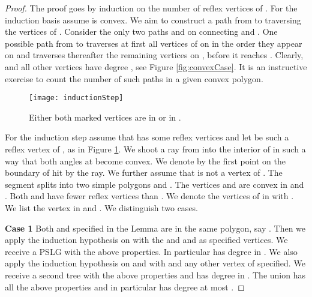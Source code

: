 \documentclass[12pt]{article}
\begin{document}
\begin{proof}
	The proof goes by induction on the number of reflex vertices of .
	For the induction basis assume  is convex. 
	We aim to construct a path from  to  traversing
	the vertices of . Consider the only two paths  and  on  connecting 
	 and . One possible path from 
	 to  traverses at first all vertices of  on  in the order 
	they appear on  and traverses thereafter the remaining vertices on ,
	before it reaches .
	Clearly,  and all other vertices have degree , see Figure \ref{fig:convexCase}. 	It is an instructive exercise to count the number of such paths in a given convex polygon.
	\begin{figure}[h]
			\begin{center}
			\texttt{[image: inductionStep]}
				\caption{Either both marked vertices are in  or in .}
				\label{fig:inductionStep}
			\end{center}
	\end{figure} 
	
	For the induction step assume that  has some reflex vertices and let  be such a reflex vertex of , as in Figure \ref{fig:inductionStep}. We shoot a ray from  into the interior of  in such a way that both angles at  become convex. We denote by  the first point on the boundary of   hit by the ray. We further assume that  is not a vertex of . The segment  splits  into two simple polygons  and . The vertices  and  are convex in  and . Both  and  have fewer reflex vertices than . We denote the vertices of  in  with . We list the vertex  in  and . We distinguish two cases. 
	
	\textbf{Case 1} Both  and  specified in the Lemma are in the same polygon, say . Then we apply the induction hypothesis on  with the  and  and  as specified vertices. We receive a PSLG  with the above properties. In particular  has degree  in . We also apply the induction hypothesis on  and  with  and any other vertex of  specified. We receive a second tree  with the above properties and  has degree  in . The union  has all the above properties and in particular  has degree at most .
	

\end{proof}
\end{document}
